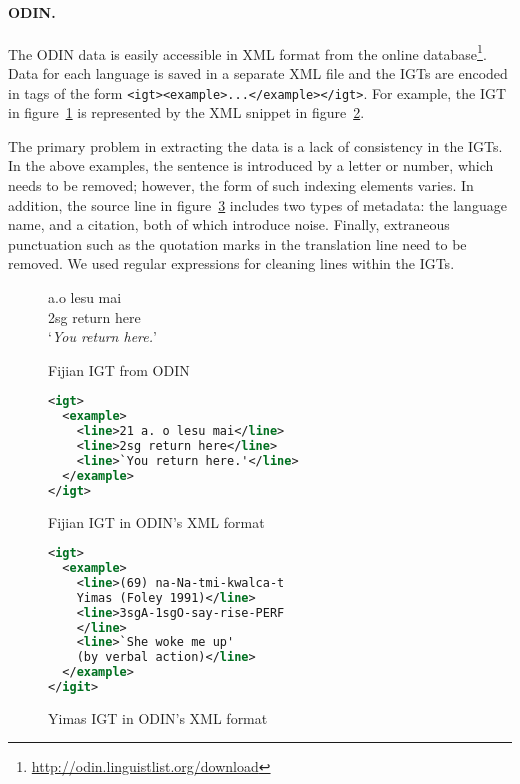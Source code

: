 \paragraph{ODIN.}
The ODIN data is easily accessible in XML format from the online database\footnote{\url{http://odin.linguistlist.org/download}}. Data for each language is saved in a separate XML file and the IGTs are encoded in tags of the form \texttt{<igt><example>...</example></igt>}.  For example, the IGT in figure~\ref{fig:odin_fijian} is represented by the XML snippet in figure~\ref{fig:odin_fijian_xml}.

The primary problem in extracting the data is a lack of consistency in the IGTs. In the above examples, the sentence is introduced by a letter or number, which needs to be removed; however, the form of such indexing elements varies. In addition, the source line in figure~\ref{fig:odin_yimas_xml} includes two types of metadata: the language name, and a citation, both of which introduce noise.  Finally, extraneous punctuation such as the quotation marks in the translation line need to be removed. We used regular expressions for cleaning lines within the IGTs.

\begin{figure}[t]
 a.\quad o lesu mai \\
\indent \qquad\qquad 2sg return here \\
\indent \qquad\qquad `\emph{You return here.}' \\
\caption{Fijian IGT from ODIN} \label{fig:odin_fijian}
\end{figure}


\begin{figure}[t]
\small
\begin{lstlisting}[language=XML]
<igt>
  <example>
    <line>21 a. o lesu mai</line>
    <line>2sg return here</line>
    <line>`You return here.'</line>
  </example>
</igt>
\end{lstlisting} 
\caption{Fijian IGT in ODIN's XML format} \label{fig:odin_fijian_xml}
\end{figure}


\begin{figure}[t]
\small
\begin{lstlisting}[language=XML]
<igt>
  <example>
    <line>(69) na-Na-tmi-kwalca-t 
    Yimas (Foley 1991)</line>
    <line>3sgA-1sgO-say-rise-PERF
    </line>
    <line>`She woke me up' 
    (by verbal action)</line>
  </example>
</igit>
\end{lstlisting} 
\smallskip
\caption{Yimas IGT in ODIN's XML format}\label{fig:odin_yimas_xml}
\end{figure}


